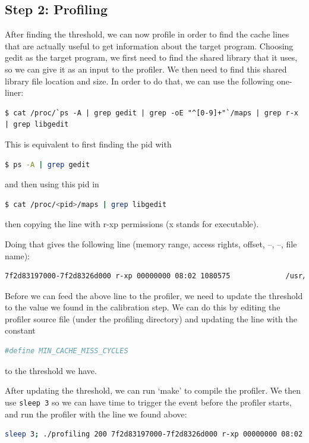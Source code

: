 \subsection{Step 2: Profiling}
After finding the threshold, we can now profile in order to find the cache lines that are actually useful to get information about the target program. Choosing gedit as the target program, we first need to find the shared library that it uses, so we can give it as an input to the profiler. We then need to find this shared library file location and size. In order to do that, we can use the following one-liner:
\begin{lstlisting}
$ cat /proc/`ps -A | grep gedit | grep -oE "^[0-9]+"`/maps | grep r-x | grep libgedit
\end{lstlisting}
This is equivalent to first finding the pid with
\begin{lstlisting}[language=bash]
  $ ps -A | grep gedit
\end{lstlisting}
and then using this pid in
\begin{lstlisting}[language=bash]
  $ cat /proc/<pid>/maps | grep libgedit
\end{lstlisting}
then copying the line with r-xp permissions (x stands for executable).

Doing that gives the following line (memory range, access rights, offset, –, –, file name):

\begin{lstlisting}[language=bash]
7f2d83197000-7f2d8326d000 r-xp 00000000 08:02 1080575             /usr/lib/gedit/libgedit.so
\end{lstlisting}

Before we can feed the above line to the profiler, we need to update the threshold to the value we found in the calibration step. We can do this by editing the profiler source file (under the profiling directory) and updating the line with the constant 
\begin{lstlisting}[language=bash]
#define MIN_CACHE_MISS_CYCLES
\end{lstlisting}
to the threshold we have.

After updating the threshold, we can run ‘make’ to compile the profiler. We then use \texttt{sleep 3} so we can have time to trigger the event before the profiler starts, and run the profiler with the line we found above: 
\begin{lstlisting}[language=bash]
sleep 3; ./profiling 200 7f2d83197000-7f2d8326d000 r-xp 00000000 08:02 1080575                    /usr/lib/gedit/libgedit.so
\end{lstlisting}

